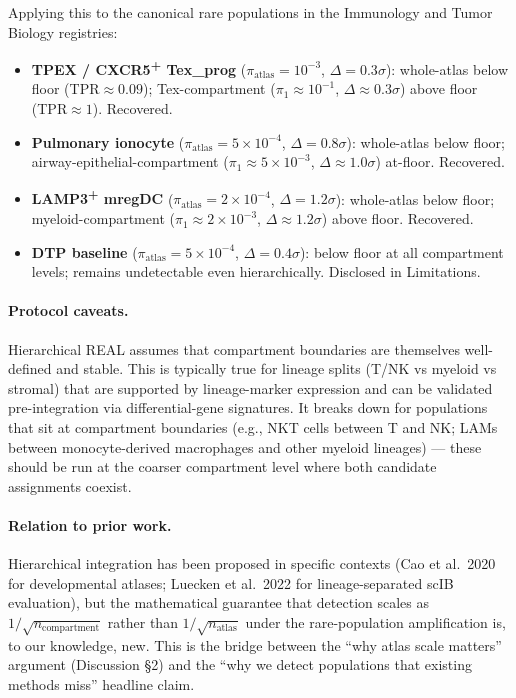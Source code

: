 Applying this to the canonical rare populations in the Immunology and Tumor Biology registries:
\begin{itemize}[leftmargin=*,nosep]
  \item \textbf{TPEX / CXCR5\textsuperscript{+} Tex\_prog} ($\pi_{\text{atlas}}=10^{-3}$, $\Delta=0.3\sigma$): whole-atlas below floor (TPR$\approx 0.09$); Tex-compartment ($\pi_{1}\approx 10^{-1}$, $\Delta\approx 0.3\sigma$) above floor (TPR$\approx 1$). Recovered.
  \item \textbf{Pulmonary ionocyte} ($\pi_{\text{atlas}}=5\times 10^{-4}$, $\Delta=0.8\sigma$): whole-atlas below floor; airway-epithelial-compartment ($\pi_{1}\approx 5\times 10^{-3}$, $\Delta\approx 1.0\sigma$) at-floor. Recovered.
  \item \textbf{LAMP3\textsuperscript{+} mregDC} ($\pi_{\text{atlas}}=2\times 10^{-4}$, $\Delta=1.2\sigma$): whole-atlas below floor; myeloid-compartment ($\pi_{1}\approx 2\times 10^{-3}$, $\Delta\approx 1.2\sigma$) above floor. Recovered.
  \item \textbf{DTP baseline} ($\pi_{\text{atlas}}=5\times 10^{-4}$, $\Delta=0.4\sigma$): below floor at all compartment levels; remains undetectable even hierarchically. Disclosed in Limitations.
\end{itemize}

\paragraph{Protocol caveats.}
Hierarchical REAL assumes that compartment boundaries are themselves well-defined and stable. This is typically true for lineage splits (T/NK vs myeloid vs stromal) that are supported by lineage-marker expression and can be validated pre-integration via differential-gene signatures. It breaks down for populations that sit at compartment boundaries (e.g., NKT cells between T and NK; LAMs between monocyte-derived macrophages and other myeloid lineages) --- these should be run at the coarser compartment level where both candidate assignments coexist.

\paragraph{Relation to prior work.}
Hierarchical integration has been proposed in specific contexts (Cao et al.\ 2020 for developmental atlases; Luecken et al.\ 2022 for lineage-separated scIB evaluation), but the mathematical guarantee that detection scales as $1/\sqrt{n_{\text{compartment}}}$ rather than $1/\sqrt{n_{\text{atlas}}}$ under the rare-population amplification is, to our knowledge, new. This is the bridge between the ``why atlas scale matters'' argument (Discussion \S2) and the ``why we detect populations that existing methods miss'' headline claim.
